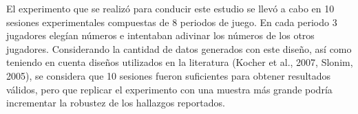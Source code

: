 El experimento que se realizó para conducir este estudio se llevó a cabo en 10 sesiones experimentales compuestas de 8 periodos de juego. En cada periodo 3 jugadores elegían números e intentaban adivinar los números de los otros jugadores. Considerando la cantidad de datos generados con este diseño, así como teniendo en cuenta diseños utilizados en la literatura (Kocher et al., 2007, Slonim, 2005), se considera que 10 sesiones fueron suficientes para obtener resultados válidos, pero que replicar el experimento con una muestra más grande podría incrementar la robustez de los hallazgos reportados.
